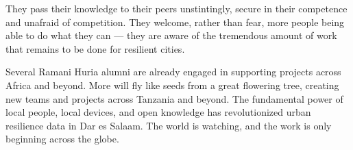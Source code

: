 \documentclass[a4paper,12pt,twoside]{article}
\begin{document}
\begin{multicols}{2}
They pass their knowledge to their peers unstintingly, secure in their competence and unafraid of competition. They welcome, rather than fear, more people being able to do what they can --- they are aware of the tremendous amount of work that remains to be done for resilient cities. 

Several Ramani Huria alumni are already engaged in supporting projects across Africa and beyond. More will fly like seeds from a great flowering tree, creating new teams and projects across Tanzania and beyond. The fundamental power of local people, local devices, and open knowledge has revolutionized urban resilience data in Dar es Salaam. The world is watching, and the work is only beginning across the globe.

\end{multicols}







\end{document}
